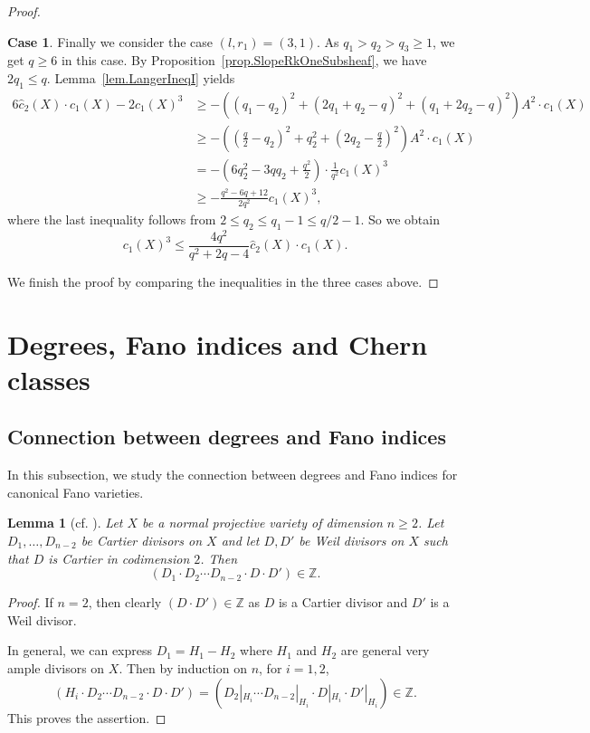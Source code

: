 \documentclass[12pt,twoside]{amsart}
\newtheorem{lem}[thm]{Lemma}
\theoremstyle{definition}
\newtheorem{case}{Case}
\begin{document}
\begin{proof}
		\begin{case}
			Finally we consider the case $(l,r_1)=(3,1)$. As $q_1>q_2>q_3\geq 1$, we get $q\geq 6$ in this case. By Proposition~\ref{prop.SlopeRkOneSubsheaf}, we have $2q_1\leq q$. Lemma~\ref{lem.LangerIneqI} yields
			\begin{align*}
				6\hat{c}_2(X)\cdot c_1(X) - 2 c_1(X)^3 
				& \geq - \left((q_1-q_2)^2 + (2q_1+q_2-q)^2 + (q_1+2q_2-q)^2\right) A^2\cdot c_1(X) \\
				& \geq - \left(\left(\frac{q}{2} - q_2\right)^2 + q_2^2 + \left(2q_2-\frac{q}{2}\right)^2\right) A^2\cdot c_1(X) \\
				& = - \left(6 q_2^2 - 3q q_2 + \frac{q^2}{2}\right)\cdot \frac{1}{q^2} c_1(X)^3 \\
				& \geq - \frac{q^2-6q+12}{2q^2} c_1(X)^3,
			\end{align*}
			where the last inequality follows from $2\leq q_2\leq q_1-1\leq q/2-1$. So we obtain
			\[
			c_1(X)^3 \leq \frac{4q^2}{q^2 + 2q- 4} \hat{c}_2(X)\cdot c_1(X).
			\]
		\end{case}
		We finish the proof by comparing the inequalities in the three cases above. 
	\end{proof}



\section{Degrees, Fano indices and Chern classes}

\subsection{Connection between degrees and Fano indices}\label{sec.lowerbound}

In this subsection, we study the connection between degrees and Fano indices for canonical Fano varieties. 

\begin{lem}[{cf. \cite[Lemma~2.3]{Jiang2016}}]\label{lem DD is integer}
 Let $X$ be a normal projective variety of dimension $n\geq 2$.
 Let $D_1,\dots, D_{n-2}$ be Cartier divisors on $X$ and let $D, D'$ be Weil divisors on $X$ such that $D$ is Cartier in codimension $2$. Then
 \[
 (D_1\cdot D_2\cdots D_{n-2}\cdot D\cdot D')\in \mathbb{Z}. 
 \]
\end{lem}


\begin{proof}
If $n=2$, then clearly $(D\cdot D')\in \mathbb{Z}$ as $D$ is a Cartier divisor and $D'$ is a Weil divisor.

In general, we can express $D_1=H_1-H_2$ where $H_1$ and $H_2$ are general very ample divisors on $X$.
Then by induction on $n$, for $i=1,2$,
\[(H_i\cdot D_2\cdots D_{n-2}\cdot D\cdot D')=(D_2|_{H_i}\cdots D_{n-2}|_{H_i}\cdot D|_{H_i}\cdot D'|_{H_i})\in \mathbb{Z}. \]
This proves the assertion.
\end{proof}
\end{document}
